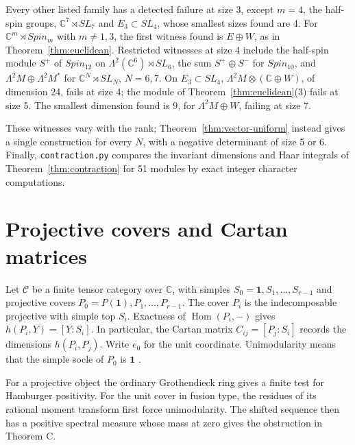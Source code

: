 \documentclass[11pt,reqno]{amsart}
\theoremstyle{definition}
\newcommand{\Hom}{\operatorname{Hom}}
\newcommand{\one}{\mathbf 1}
\newcommand{\C}{\mathcal C}
\newcommand{\CC}{\mathbb C}
\begin{document}
Every other listed family has a detected failure at size 3, except $m=4$, the half-spin groups, $\CC^7\rtimes SL_7$ and $E_3\subset SL_4$, whose smallest sizes found are 4. For $\CC^m\rtimes Spin_m$ with $m\neq1,3$, the first witness found is $E\oplus W$, as in Theorem~\ref{thm:euclidean}. Restricted witnesses at size 4 include the half-spin module $S^+$ of $Spin_{12}$ on $\Lambda^2(\CC^6)\rtimes SL_6$, the sum $S^+\oplus S^-$ for $Spin_{10}$, and $\Lambda^2M\oplus\Lambda^2M^*$ for $\CC^N\rtimes SL_N$, $N=6,7$. On $E_3\subset SL_4$, $\Lambda^2M\otimes(\CC\oplus W)$, of dimension 24, fails at size 4; the module of Theorem~\ref{thm:euclidean}(3) fails at size 5. The smallest dimension found is 9, for $\Lambda^2M\oplus W$, failing at size 7.

These witnesses vary with the rank; Theorem~\ref{thm:vector-uniform} instead gives a single construction for every $N$, with a negative determinant of size 5 or 6. Finally, \texttt{contraction.py} compares the invariant dimensions and Haar integrals of Theorem~\ref{thm:contraction} for 51 modules by exact integer character computations.


\section{Projective covers and Cartan matrices}\label{sec:cartan}

Let $\C$ be a finite tensor category over $\CC$, with simples $S_0=\one,S_1,\ldots,S_{r-1}$ and projective covers $P_0=P(\one),P_1,\ldots,P_{r-1}$. The cover $P_i$ is the indecomposable projective with simple top $S_i$. Exactness of $\Hom(P_i,-)$ gives $h(P_i,Y)=[Y:S_i]$. In particular, the Cartan matrix $C_{ij}=[P_j:S_i]$ records the dimensions $h(P_i,P_j)$. Write $e_0$ for the unit coordinate. Unimodularity means that the simple socle of $P_0$ is $\one$ \cite[\S\S6.1, 6.5]{EGNO}.

For a projective object the ordinary Grothendieck ring gives a finite test for Hamburger positivity. For the unit cover in fusion type, the residues of its rational moment transform first force unimodularity. The shifted sequence then has a positive spectral measure whose mass at zero gives the obstruction in Theorem C.
\end{document}
